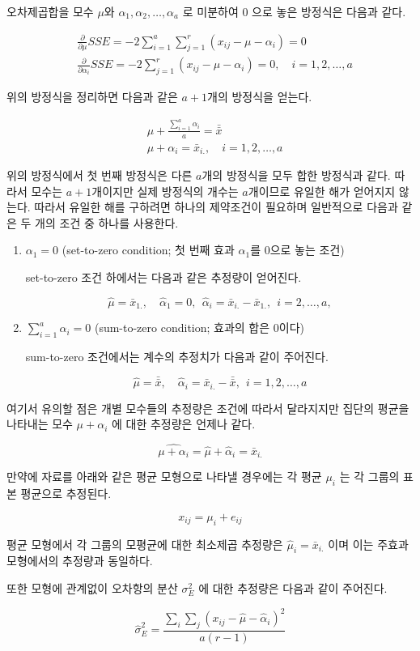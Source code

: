\documentclass[
]{book}
\newcommand{\pardiff}[2]{\frac{\partial #1}{\partial #2 }}
\begin{document}
오차제곱합을 모수 \(\mu\)와 \(\alpha_1,\alpha_2,\dots,\alpha_a\) 로 미분하여 0 으로 놓은 방정식은 다음과 같다.

\begin{align*}
& \pardiff{}{\mu} SSE = -2 \sum_{i=1}^a \sum_{j=1}^r (x_{ij} - \mu -\alpha_i) = 0 \\
& \pardiff{}{\alpha_i} SSE = -2 \sum_{j=1}^r (x_{ij} - \mu -\alpha_i) = 0 , \quad i=1,2,\dots, a 
\end{align*}

위의 방정식을 정리하면 다음과 같은 \(a+1\)개의 방정식을 얻는다.

\begin{align*}
&   \mu +\frac{ \sum_{i=1}^a \alpha_i}{a} = \bar {\bar x}\\
&   \mu + \alpha_i =  \bar {x}_{i.} , \quad i=1,2,\dots, a 
\end{align*}

위의 방정식에서 첫 번째 방정식은 다른 \(a\)개의 방정식을 모두 합한 방정식과 같다. 따라서 모수는 \(a+1\)개이지만 실제 방정식의 개수는 \(a\)개이므로
유일한 해가 얻어지지 않는다. 따라서 유일한 해를 구하려면 하나의 제약조건이 필요하며 일반적으로 다음과 같은 두 개의 조건 중 하나를 사용한다.

\begin{enumerate}
\def\labelenumi{\arabic{enumi}.}
\item
  \(\alpha_1=0\) (set-to-zero condition; 첫 번째 효과 \(\alpha_1\)를 0으로 놓는 조건)

  set-to-zero 조건 하에서는 다음과 같은 추정량이 얻어진다.

  \[ \hat \mu = \bar {x}_{1.}, \quad \hat \alpha_1=0, ~~  \hat \alpha_i = \bar {x}_{i.} -\bar {x}_{1.},~~i=2,\dots,a, \]
\item
  \(\sum_{i=1}^a \alpha_i=0\) (sum-to-zero condition; 효과의 합은 0이다)

  sum-to-zero 조건에서는 계수의 추정치가 다음과 같이 주어진다.

  \[ \hat \mu = \bar {\bar {x}}, \quad \hat \alpha_i = \bar {x}_{i.} -\bar {\bar {x}},~~i=1,2,\dots,a \]
\end{enumerate}

여기서 유의할 점은 개별 모수들의 추정량은 조건에 따라서 달라지지만 집단의 평균을 나타내는 모수 \(\mu+ \alpha_i\) 에 대한 추정량은 언제나 같다.

\[ \widehat{\mu+ \alpha_i} = \hat \mu + \hat {\alpha}_i =  \bar {x}_{i.} \]

만약에 자료를 아래와 같은 평균 모형으로 나타낼 경우에는 각 평균 \(\mu_i\) 는 각 그룹의 표본 평균으로 추정된다.

\[ x_{ij} = \mu_i + e_{ij} \]

평균 모형에서 각 그룹의 모평균에 대한 최소제곱 추정량은 \(\hat \mu_i = \bar {x}_{i.}\) 이며 이는 주효과 모형에서의 추정량과 동일하다.

또한 모형에 관계없이 오차항의 분산 \(\sigma_E^2\) 에 대한 추정량은 다음과 같이 주어진다.

\begin{equation} \label{varest1}
\hat \sigma_E^2 = \frac{ \sum_i \sum_j (x_{ij} - \hat \mu -\hat \alpha_i )^2}{a(r-1)}
\end{equation}

  
\end{document}

